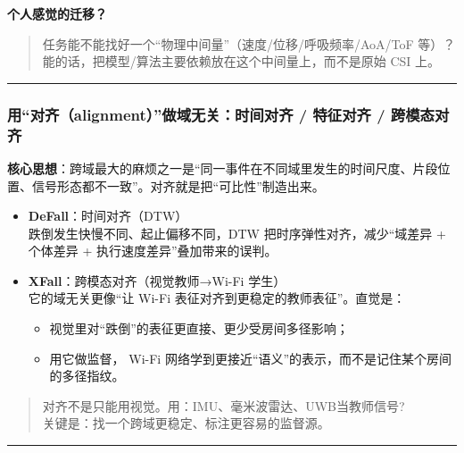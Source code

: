 \documentclass[
]{article}
\begin{document}
\textbf{个人感觉的迁移？}

\begin{quote}
任务能不能找好一个``物理中间量''（速度/位移/呼吸频率/AoA/ToF 等）？\\
能的话，把模型/算法主要依赖放在这个中间量上，而不是原始 CSI 上。
\end{quote}

\begin{center}\rule{0.5\linewidth}{0.5pt}\end{center}

\subsubsection{用``对齐（alignment）''做域无关：时间对齐 / 特征对齐 /
跨模态对齐}\label{ux7528ux5bf9ux9f50alignmentux505aux57dfux65e0ux5173ux65f6ux95f4ux5bf9ux9f50--ux7279ux5f81ux5bf9ux9f50--ux8de8ux6a21ux6001ux5bf9ux9f50}

\textbf{核心思想}：跨域最大的麻烦之一是``同一事件在不同域里发生的时间尺度、片段位置、信号形态都不一致''。对齐就是把``可比性''制造出来。

\begin{itemize}
\item
  \textbf{DeFall}：时间对齐（DTW）\\
  跌倒发生快慢不同、起止偏移不同，DTW 把时序弹性对齐，减少``域差异 +
  个体差异 + 执行速度差异''叠加带来的误判。
\item
  \textbf{XFall}：跨模态对齐（视觉教师→Wi-Fi 学生）\\
  它的域无关更像``让 Wi-Fi 表征对齐到更稳定的教师表征''。直觉是：

  \begin{itemize}
  \item
    视觉里对``跌倒''的表征更直接、更少受房间多径影响；
  \item
    用它做监督， Wi-Fi
    网络学到更接近``语义''的表示，而不是记住某个房间的多径指纹。
  \end{itemize}
\end{itemize}

\begin{quote}
对齐不是只能用视觉。用：IMU、毫米波雷达、UWB当教师信号?\\
关键是：找一个跨域更稳定、标注更容易的监督源。
\end{quote}

\begin{center}\rule{0.5\linewidth}{0.5pt}\end{center}
\end{document}
